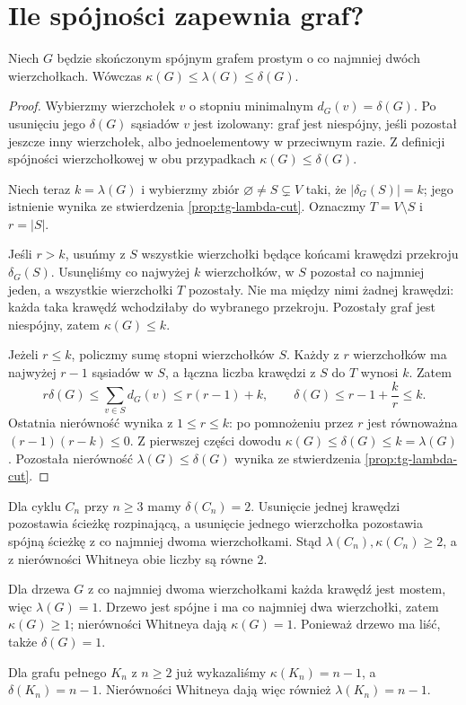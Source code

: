 \section{Ile spójności zapewnia graf?}
\label{sec:tg-whitney}

\begin{twierdzenie}
\label{thm:tg-whitney}
Niech $G$ będzie skończonym spójnym grafem prostym
o co najmniej dwóch wierzchołkach. Wówczas
$\kappa(G)\le\lambda(G)\le\delta(G)$.
\end{twierdzenie}

\begin{proof}
Wybierzmy wierzchołek $v$ o stopniu minimalnym
$d_G(v)=\delta(G)$. Po usunięciu jego $\delta(G)$
sąsiadów $v$ jest izolowany: graf jest niespójny,
jeśli pozostał jeszcze inny wierzchołek, albo
jednoelementowy w przeciwnym razie. Z definicji
spójności wierzchołkowej w obu przypadkach
$\kappa(G)\le\delta(G)$.

Niech teraz $k=\lambda(G)$ i wybierzmy zbiór
$\varnothing\ne S\subsetneq V$ taki, że
$|\delta_G(S)|=k$; jego istnienie wynika ze
stwierdzenia \ref{prop:tg-lambda-cut}. Oznaczmy
$T=V\setminus S$ i $r=|S|$.

Jeśli $r>k$, usuńmy z $S$ wszystkie wierzchołki
będące końcami krawędzi przekroju $\delta_G(S)$.
Usunęliśmy co najwyżej $k$ wierzchołków,
w $S$ pozostał co najmniej jeden, a wszystkie
wierzchołki $T$ pozostały. Nie ma między nimi
żadnej krawędzi: każda taka krawędź wchodziłaby
do wybranego przekroju. Pozostały graf jest
niespójny, zatem $\kappa(G)\le k$.

Jeżeli $r\le k$, policzmy sumę stopni wierzchołków $S$.
Każdy z $r$ wierzchołków ma najwyżej $r-1$
sąsiadów w $S$, a łączna liczba krawędzi
z $S$ do $T$ wynosi $k$. Zatem
\[
r\delta(G)\le\sum_{v\in S}d_G(v)\le r(r-1)+k,
\qquad
\delta(G)\le r-1+\frac{k}{r}\le k.
\]
Ostatnia nierówność wynika z $1\le r\le k$:
po pomnożeniu przez $r$ jest równoważna
$(r-1)(r-k)\le0$. Z pierwszej części dowodu
$\kappa(G)\le\delta(G)\le k=\lambda(G)$.
Pozostała nierówność $\lambda(G)\le\delta(G)$
wynika ze stwierdzenia \ref{prop:tg-lambda-cut}.
\end{proof}



\begin{przyklad}
Dla cyklu $C_n$ przy $n\ge3$ mamy
$\delta(C_n)=2$. Usunięcie jednej krawędzi pozostawia
ścieżkę rozpinającą, a usunięcie jednego wierzchołka
pozostawia spójną ścieżkę z co najmniej dwoma
wierzchołkami. Stąd $\lambda(C_n),\kappa(C_n)\ge2$,
a z nierówności Whitneya obie liczby są równe $2$.

Dla drzewa $G$ z co najmniej dwoma wierzchołkami
każda krawędź jest mostem, więc $\lambda(G)=1$.
Drzewo jest spójne i ma co najmniej dwa wierzchołki,
zatem $\kappa(G)\ge1$; nierówności Whitneya dają
$\kappa(G)=1$. Ponieważ drzewo ma liść, także
$\delta(G)=1$.

Dla grafu pełnego $K_n$ z $n\ge2$ już wykazaliśmy
$\kappa(K_n)=n-1$, a $\delta(K_n)=n-1$.
Nierówności Whitneya dają więc również
$\lambda(K_n)=n-1$.
\end{przyklad}

